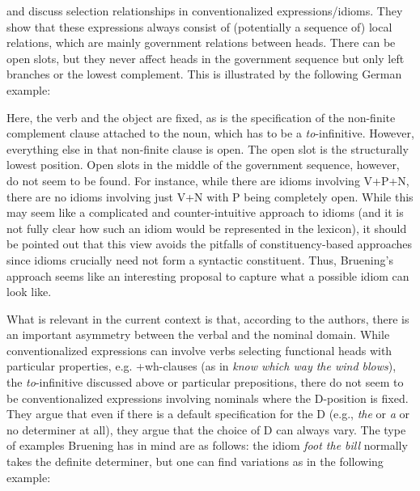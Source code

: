 \documentclass[output=paper,colorlinks,citecolor=black,
]{langscibook}
\begin{document}
 \citet{Bruening-et-al:2018:Selection-Idioms-NP} and \citet{Bruening:2020:NP-DP} discuss selection relationships in conventionalized expressions/idioms. They show that these expressions always consist of (potentially a sequence of) local relations, which are mainly government relations between heads. There can be open slots, but they never affect heads in the government sequence but only left branches or the lowest complement. This is illustrated by the following German example:

\largerpage
    \z
 
 Here, the verb and the object are fixed, as is the specification of the non-finite complement clause attached to the noun, which has to be a \textit{to}-infinitive. However, everything else in that non-finite clause is open. The open slot is the structurally lowest position. Open slots in the middle of the government sequence, however, do not seem to be found. For instance, while there are idioms involving V+P+N, there are no idioms involving just V+N with P being completely open. While this may seem like a complicated and counter-intuitive approach to idioms (and it is not fully clear how such an idiom would be represented in the lexicon), it should be pointed out that this view avoids the pitfalls of constituency-based approaches since idioms crucially need not form a syntactic constituent. Thus, Bruening's approach seems like an interesting proposal to capture what a possible idiom can look like.
 
 What is relevant in the current context is that, according to the authors, there is an important asymmetry between the verbal and the nominal domain. While conventionalized expressions can involve verbs selecting functional heads with particular properties, e.g. +wh-clauses (as in \textit{know which way the wind blows}), the \textit{to}-infinitive discussed above or particular prepositions, there do not seem to be conventionalized expressions involving nominals where the D-position is fixed. They argue that even if there is a default specification for the D (e.g., \textit{the} or \textit{a} or no determiner at all), they argue that the choice of D can always vary. The type of examples Bruening has in mind are as follows: the idiom \textit{foot the bill} normally takes the definite determiner, but one can find variations as in the following example:
 
\end{document}
